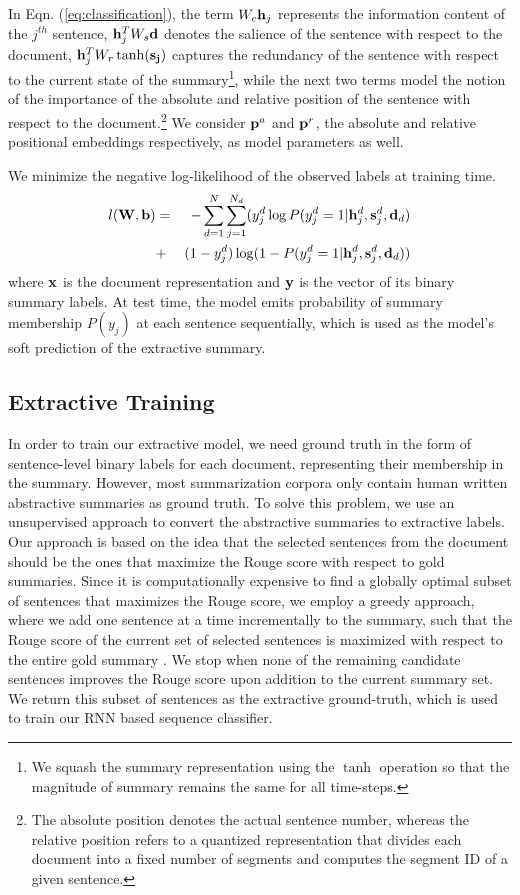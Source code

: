 \documentclass[letterpaper]{article}
\begin{document}
In Eqn. (\ref{eq:classification}), the term $W_c{\bf h}_j$ represents the information content of the $j^{th}$ sentence, ${\bf h}_j^TW_{s}{\bf d}$ denotes the salience of the sentence with respect to the document, ${\bf h}_j^TW_{r}\tanh({\bf s_j})$ captures the redundancy of the sentence with respect to the current state of the summary\footnote{We squash the summary representation using the $\tanh$ operation so that the magnitude of summary remains the same for all time-steps.}, while the next two terms model the notion of the importance of the absolute and relative position of the sentence with respect to the document.\footnote{The absolute position denotes the actual sentence number, whereas the relative position refers to a quantized representation that divides each document into a fixed number of segments and computes the segment ID of a given sentence.} We consider ${\bf p}^a$ and ${\bf p}^r$, the absolute and relative positional embeddings respectively, as model parameters as well.

We minimize the negative log-likelihood of the observed labels at training time.
\begin{eqnarray}
l({\bf W}, {\bf b}) &=& -\sum_{d=1}^N \sum_{j=1}^{N_d}(y_j^d\log P(y_j^d=1|{\bf h}_j^d,{\bf s}_j^d,{\bf d}_d) \nonumber\\
& +& (1-y_j^d)\log(1- P(y_j^d=1|{\bf h}_j^d,{\bf s}_j^d,{\bf d}_d))\nonumber\\
\label{eq:lhood}
\end{eqnarray}
where ${\bf x}$ is the document representation and ${\bf y}$ is the vector of its binary summary labels. 
At test time, the model emits probability of summary membership $P(y_j)$ at each sentence sequentially, which is used as the model's soft prediction of the extractive summary. 

\subsection{Extractive Training}\label{sec:extractive_training}
 In order to train our extractive model, we need ground truth in the form of sentence-level binary labels for each document, representing their membership in the summary. However, most summarization corpora only contain human written abstractive summaries as ground truth. To solve this problem, we use an unsupervised approach to convert the abstractive summaries to extractive labels. Our approach is based on the idea that the selected sentences from the document should be the ones that maximize the Rouge score with respect to gold summaries. Since it is computationally expensive to find a globally optimal subset of sentences that maximizes the Rouge score, we employ a greedy approach, where we add one sentence at a time incrementally to the summary, such that the Rouge score of the current set of selected sentences is maximized with respect to the entire gold summary . 
We stop when none of the remaining candidate sentences improves the Rouge score upon addition to the current summary set. We return this subset of sentences as the extractive ground-truth, which is used to train our RNN based sequence classifier. 
\end{document}
